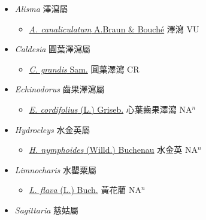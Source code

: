 
  \begin{itemize}
 \item[] \textit{Alisma} 澤瀉屬
                    
  \begin{itemize}
        \item[] \href{http://www.theplantlist.org/tpl1.1/search?q=Alisma+canaliculatum}{\textit{A. canaliculatum} A.Braun \& Bouché}   澤瀉 VU
  \end{itemize}
 \item[] \textit{Caldesia} 圓葉澤瀉屬
                    
  \begin{itemize}
        \item[] \href{http://www.theplantlist.org/tpl1.1/search?q=Caldesia+grandis}{\textit{C. grandis} Sam.}   圓葉澤瀉 CR
  \end{itemize}
 \item[] \textit{Echinodorus} 齒果澤瀉屬
                    
  \begin{itemize}
        \item[] \href{http://www.theplantlist.org/tpl1.1/search?q=Echinodorus+cordifolius}{\textit{E. cordifolius} (L.) Griseb.}   心葉齒果澤瀉 NA$^n$
  \end{itemize}
 \item[] \textit{Hydrocleys} 水金英屬
                    
  \begin{itemize}
        \item[] \href{http://www.theplantlist.org/tpl1.1/search?q=Hydrocleys+nymphoides}{\textit{H. nymphoides} (Willd.) Buchenau}   水金英 NA$^n$
  \end{itemize}
 \item[] \textit{Limnocharis} 水罌粟屬
                    
  \begin{itemize}
        \item[] \href{http://www.theplantlist.org/tpl1.1/search?q=Limnocharis+flava}{\textit{L. flava} (L.) Buch.}   黃花藺 NA$^n$
  \end{itemize}
 \item[] \textit{Sagittaria} 慈姑屬
                    

\end{itemize}

